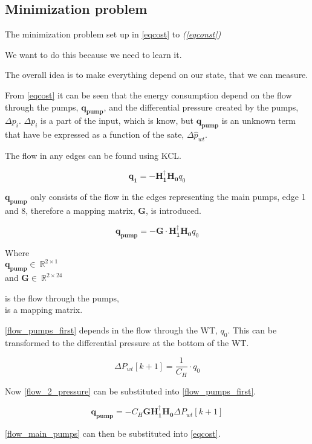 \subsection{Minimization problem}
\label{mini_problem}

The minimization problem set up in \eqref{eqcost} to \textit{(\ref{eqconst})}

We want to do this because we need to learn it. 

The overall idea is to make everything depend on our state, that we can measure. 

From \eqref{eqcost} it can be seen that the energy consumption depend on the flow through the pumps, $\pmb{q_{pump}}$, and the differential pressure created by the pumps, $\Delta{p}_i$. $\Delta{p}_i$ is a part of the input, which is know, but $\pmb{q_{pump}}$ is an unknown term that have be expressed as a function of the sate, $\Delta \hat{p}_{wt}$. 

The flow in any edges can be found using KCL. 

\begin{equation}
\pmb{q_1} = -\pmb{H_1^{\dagger} H_0} q_0
\end{equation}

$\pmb{q_{pump}}$ only consists of the flow in the edges representing the main pumps, edge 1 and 8, therefore a mapping matrix, $\pmb{G}$, is introduced. 

\begin{equation}
\pmb{q_{pump}} = - \pmb{G} \cdot \pmb{H_1^{\dagger} H_0} q_0 \label{flow_pumps_first}
\end{equation}

\begin{minipage}[t]{0.24\textwidth}
Where\\
\hspace*{8mm} $\pmb{q_{pump}} \in \: \mathbb{R}^{2 \times 1}$  \\
and \hspace*{0.4mm} $\pmb{G} \in \: \mathbb{R}^{2 \times 24} $ 
\end{minipage}
\begin{minipage}[t]{0.70\textwidth}
\vspace*{2mm}
\hspace*{4mm} is the flow through the pumps,\\
\hspace*{4mm} is a mapping matrix.
\end{minipage}

\eqref{flow_pumps_first} depends in the flow through the WT, $q_0$. This can be transformed to the differential pressure at the bottom of the WT.

\begin{equation}
\Delta P_{wt}[k+1] = \frac{1}{C_H} \cdot q_0 \label{flow_2_pressure}
\end{equation}

Now \eqref{flow_2_pressure} can be substituted into \eqref{flow_pumps_first}.  

\begin{equation}
\pmb{q_{pump}} = -C_H \pmb{G H_1^{\dagger} H_0} \Delta P_{wt}[k+1] \label{flow_main_pumps}
\end{equation}

\eqref{flow_main_pumps} can then be substituted into \eqref{eqcost}. 